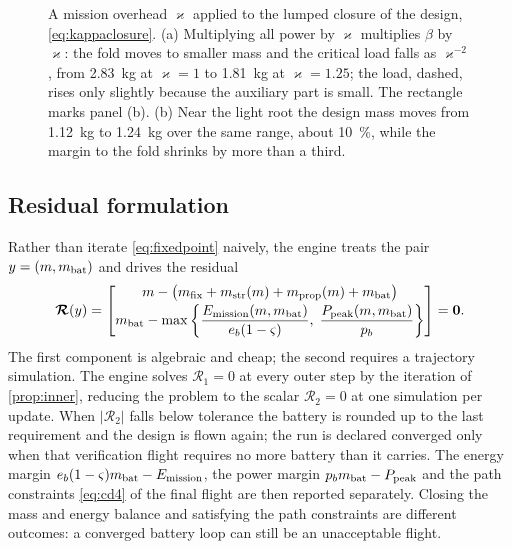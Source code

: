 \begin{figure}[tbp]
\centering

\caption{A mission overhead $\varkappa$ applied to the lumped closure of the
design, \cref{eq:kappaclosure}. (a) Multiplying all power by $\varkappa$
multiplies $\beta$ by $\varkappa$: the fold moves to smaller mass and the
critical load falls as $\varkappa^{-2}$, from \SI{2.83}{\kilo\gram} at
$\varkappa=1$ to \SI{1.81}{\kilo\gram} at $\varkappa=1.25$; the load, dashed,
rises only slightly because the auxiliary part is small. The rectangle marks
panel (b). (b) Near the light root the design mass moves from
\SI{1.12}{\kilo\gram} to \SI{1.24}{\kilo\gram} over the same range, about
\SI{10}{\percent}, while the margin to the fold shrinks by more than a third.}
\label{fig:kappa}
\end{figure}

\subsection{Residual formulation}

Rather than iterate \cref{eq:fixedpoint} naively, the engine treats the pair
$y = (m,m_{\mathrm{bat}})$ and drives the residual
\begin{equation}
  \bm{\mathcal{R}}(y) =
  \begin{bmatrix}
    m - \big(m_{\mathrm{fix}} + m_{\mathrm{str}}(m) + m_{\mathrm{prop}}(m) + m_{\mathrm{bat}}\big) \\[2pt]
    m_{\mathrm{bat}} - \max\left\{\dfrac{E_{\mathrm{mission}}(m,m_{\mathrm{bat}})}{e_b(1-\varsigma)},\;
                       \dfrac{P_{\mathrm{peak}}(m,m_{\mathrm{bat}})}{p_b}\right\}
  \end{bmatrix}
  = \bm{0} .
  \label{eq:residual}
\end{equation}
The first component is algebraic and cheap; the second requires a trajectory
simulation. The engine solves $\mathcal{R}_1=0$ at every outer step by the
iteration of \cref{prop:inner}, reducing the problem to the scalar
$\mathcal{R}_2=0$ at one simulation per update. When $|\mathcal{R}_2|$ falls
below tolerance the battery is rounded up to the last requirement and the
design is flown again; the run is declared converged only when that
verification flight requires no more battery than it carries. The energy margin
$e_b(1-\varsigma)m_{\mathrm{bat}}-E_{\mathrm{mission}}$, the power margin
$p_bm_{\mathrm{bat}}-P_{\mathrm{peak}}$ and the path constraints \cref{eq:cd4} of the final
flight are then reported separately. Closing the mass and energy balance and
satisfying the path constraints are different outcomes: a converged battery
loop can still be an unacceptable flight.

